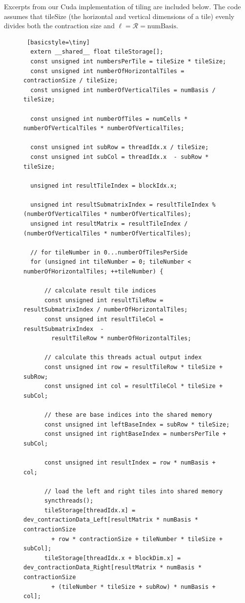 	Excerpts from our Cuda implementation of tiling are included below. The code assumes that tileSize (the horizontal and vertical dimensions of a tile) evenly divides both the contraction size and $\ell = \mathcal{R} = \text{numBasis}$.
	
\begin{figure}
    \begin{lstlisting} [basicstyle=\tiny]
  extern __shared__ float tileStorage[];
  const unsigned int numbersPerTile = tileSize * tileSize;
  const unsigned int numberOfHorizontalTiles = contractionSize / tileSize;
  const unsigned int numberOfVerticalTiles = numBasis / tileSize;

  const unsigned int numberOfTiles = numCells * numberOfVerticalTiles * numberOfVerticalTiles;

  const unsigned int subRow = threadIdx.x / tileSize;
  const unsigned int subCol = threadIdx.x  - subRow * tileSize;

  unsigned int resultTileIndex = blockIdx.x;

  unsigned int resultSubmatrixIndex = resultTileIndex % (numberOfVerticalTiles * numberOfVerticalTiles);
  unsigned int resultMatrix = resultTileIndex / (numberOfVerticalTiles * numberOfVerticalTiles);

  // for tileNumber in 0...numberOfTilesPerSide
  for (unsigned int tileNumber = 0; tileNumber < numberOfHorizontalTiles; ++tileNumber) {
      
      // calculate result tile indices
      const unsigned int resultTileRow = resultSubmatrixIndex / numberOfHorizontalTiles;
      const unsigned int resultTileCol = resultSubmatrixIndex  -
        resultTileRow * numberOfHorizontalTiles;

      // calculate this threads actual output index
      const unsigned int row = resultTileRow * tileSize + subRow;
      const unsigned int col = resultTileCol * tileSize + subCol;

      // these are base indices into the shared memory
      const unsigned int leftBaseIndex = subRow * tileSize;
      const unsigned int rightBaseIndex = numbersPerTile + subCol;

      const unsigned int resultIndex = row * numBasis + col;

      // load the left and right tiles into shared memory
      syncthreads();
      tileStorage[threadIdx.x] = dev_contractionData_Left[resultMatrix * numBasis * contractionSize
        + row * contractionSize + tileNumber * tileSize + subCol];
      tileStorage[threadIdx.x + blockDim.x] = dev_contractionData_Right[resultMatrix * numBasis * contractionSize
        + (tileNumber * tileSize + subRow) * numBasis + col];
      

\end{lstlisting}
\end{figure}
